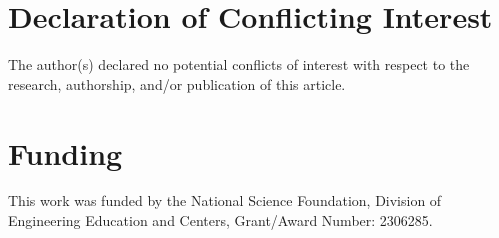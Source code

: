 \documentclass[fleqn,10pt]{JLA_article} %
\begin{document}
\section*{Declaration of Conflicting Interest} %


The author(s) declared no potential conflicts of interest with respect to the research, authorship, and/or publication of this article.

\section*{Funding} %


This work was funded by the National Science Foundation, Division of Engineering Education and Centers, Grant/Award Number: 2306285.



\end{document}
